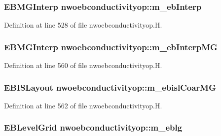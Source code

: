 \subsubsection[{\texorpdfstring{m\+\_\+eb\+Interp}{m_ebInterp}}]{\setlength{\rightskip}{0pt plus 5cm}E\+B\+M\+G\+Interp nwoebconductivityop\+::m\+\_\+eb\+Interp\hspace{0.3cm}{\ttfamily [protected]}}\hypertarget{classnwoebconductivityop_ad2edda646ce68834fccc58cc9f11c7f4}{}\label{classnwoebconductivityop_ad2edda646ce68834fccc58cc9f11c7f4}


Definition at line 528 of file nwoebconductivityop.\+H.

\subsubsection[{\texorpdfstring{m\+\_\+eb\+Interp\+MG}{m_ebInterpMG}}]{\setlength{\rightskip}{0pt plus 5cm}E\+B\+M\+G\+Interp nwoebconductivityop\+::m\+\_\+eb\+Interp\+MG\hspace{0.3cm}{\ttfamily [protected]}}\hypertarget{classnwoebconductivityop_a679214af40c6abfb0073a4e1236f2260}{}\label{classnwoebconductivityop_a679214af40c6abfb0073a4e1236f2260}


Definition at line 560 of file nwoebconductivityop.\+H.

\subsubsection[{\texorpdfstring{m\+\_\+ebisl\+Coar\+MG}{m_ebislCoarMG}}]{\setlength{\rightskip}{0pt plus 5cm}E\+B\+I\+S\+Layout nwoebconductivityop\+::m\+\_\+ebisl\+Coar\+MG\hspace{0.3cm}{\ttfamily [protected]}}\hypertarget{classnwoebconductivityop_ab756c386aec95cd4c15626acb24c66c6}{}\label{classnwoebconductivityop_ab756c386aec95cd4c15626acb24c66c6}


Definition at line 562 of file nwoebconductivityop.\+H.

\subsubsection[{\texorpdfstring{m\+\_\+eblg}{m_eblg}}]{\setlength{\rightskip}{0pt plus 5cm}E\+B\+Level\+Grid nwoebconductivityop\+::m\+\_\+eblg\hspace{0.3cm}{\ttfamily [protected]}}\hypertarget{classnwoebconductivityop_aaa22b991b43d535ae41e40383d233846}{}\label{classnwoebconductivityop_aaa22b991b43d535ae41e40383d233846}


